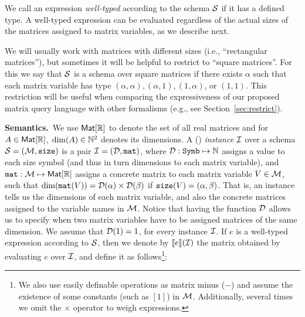 We call an expression \textit{well-typed} according to the schema $\mathcal{S}$ if it has a defined type. A well-typed expression can be evaluated regardless of the actual sizes of the matrices assigned to matrix variables, as we describe next.

We will usually work with matrices with different sizes (i.e., ``rectangular matrices''), but sometimes it will be helpful to restrict to ``square matrices''. For this we say that $\mathcal{S}$ is a schema over square matrices if there exists $\alpha$ such that each matrix variable has type $(\alpha,\alpha),(\alpha,1),(1,\alpha)$, or $(1,1)$. This restriction will be useful when comparing the expressiveness of our proposed matrix query language with other formalisms (e.g., see Section~\ref{sec:restrict}). 

\smallskip
\noindent
\textbf{Semantics.}\, We use $\textsf{Mat}[\mathbb{R}]$ to denote the set of all real matrices and for $A\in\textsf{Mat}[\mathbb{R}]$, $\dim(A)\in\mathbb{N}^2$ denotes its dimensions. A (\lang) \textit{instance} $\mathcal{I}$ over a schema $\mathcal{S}=(\mathcal{M},\texttt{size})$ is a pair $\mathcal{I} = (\mathcal{D},\texttt{mat})$, where $\mathcal{D} : \texttt{Symb} \mapsto \mathbb{N}$ assigns a value to each size symbol (and thus in turn  dimensions to each matrix variable), and $\texttt{mat} : \mathcal{M} \mapsto \textsf{Mat}[\mathbb{R}]$ assigns a concrete matrix to each matrix variable $V\in \mathcal{M}$, such that $\dim(\texttt{mat}(V)) = \mathcal{D}(\alpha)\times \mathcal{D}(\beta)$ if $\texttt{size}(V) = (\alpha,\beta)$. That is, an instance tells us the dimensions of each matrix variable, and also the concrete matrices assigned to the variable names in $\mathcal{M}$. Notice that having the function $\mathcal{D}$ allows us to specify when two matrix variables have to be assigned matrices of the same dimension. We assume that $\mathcal{D}(1) = 1$, for every instance $\mathcal{I}$. If $e$ is a well-typed expression according to $\mathcal{S}$, then we denote by $\llbracket e \rrbracket(\mathcal{I})$ the matrix obtained by evaluating $e$ over $\mathcal{I}$, and define it as follows\footnote{We also use easily definable operations as matrix minus ($-$) and assume the existence of some constants (such as $[1]$) in $\mathcal{M}$. Additionally, several times we omit the $\times$ operator to weigh expressions.}:

